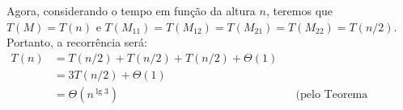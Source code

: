 Agora, considerando o tempo em função da altura $n$, teremos que $T(M) = T(n)$ e $T(M_{11}) = T(M_{12}) = T(M_{21}) = T(M_{22}) = T(n/2)$. Portanto, a recorrência será:
\begin{align*}
    T(n) &= T(n/2) + T(n/2) + T(n/2) + \Theta(1) \\
    &= 3 T(n/2) + \Theta(1) \\
    &= \Theta(n^{\lg 3}) && \text{(pelo Teorema Master)}
\end{align*}
